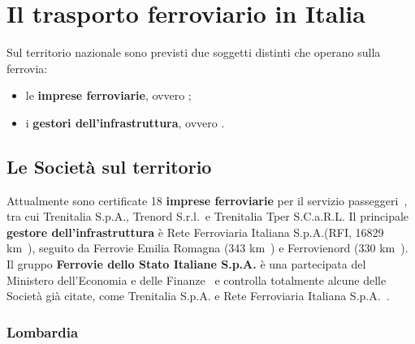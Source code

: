 \documentclass[12pt,a4paper,italian]{report}
\begin{document}
\section{Il trasporto ferroviario in Italia}

Sul territorio nazionale sono previsti due soggetti distinti che
operano sulla ferrovia:
\begin{itemize}
	\item le \textbf{imprese ferroviarie}, ovvero ;
	\item i \textbf{gestori dell'infrastruttura}, ovvero
    .
\end{itemize}

\subsection{Le Società sul territorio}
\label{societa_territorio}

Attualmente sono certificate 18 \textbf{imprese ferroviarie} per il
servizio passeggeri~\cite{ElencoIF}, tra cui Trenitalia S.p.A.,
Trenord S.r.l.\ e Trenitalia Tper S.C.a.R.L\@.  Il principale
\textbf{gestore dell'infrastruttura} è Rete Ferroviaria Italiana
S.p.A.\@ (RFI, 16829 km~\cite{RfiKm}), seguito da Ferrovie Emilia
Romagna (343 km~\cite{FerKm}) e Ferrovienord (330
km~\cite{FerNordKm}).  Il gruppo \textbf{Ferrovie dello Stato Italiane
    S.p.A.} è una partecipata del Ministero dell'Economia e delle
Finanze~\cite{MefGruppoFS} e controlla totalmente alcune delle Società
già citate, come Trenitalia S.p.A\@. e Rete Ferroviaria Italiana
S.p.A\@.~\cite{ControllateFS}.

\subsubsection{Lombardia}
\end{document}
